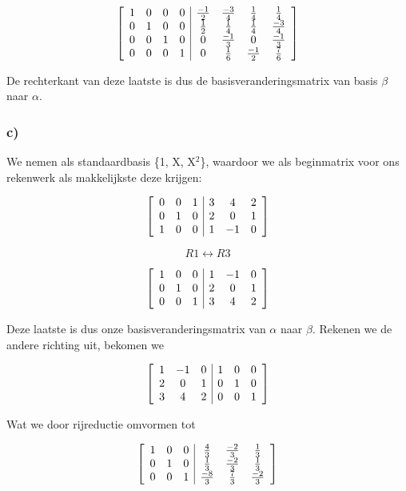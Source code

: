 \documentclass[lineaire_algebra_oplossingen.tex]{subfiles}
\begin{document}
\[
\left[
\begin{array}{ c c c c | c c c c }
1 & 0 & 0 & 0 & \frac{-1}{2} & \frac{-3}{4} & \frac{1}{4} & \frac{1}{4}\\
0 & 1 & 0 & 0 & \frac{1}{2} & \frac{1}{4} & \frac{1}{4} & \frac{-3}{4}\\
0 & 0 & 1 & 0 & 0 & \frac{-1}{3} & 0 & \frac{-1}{3}\\
0 & 0 & 0 & 1 & 0 & \frac{1}{6} & \frac{-1}{2} & \frac{7}{6}
\end{array}
\right]
\]

De rechterkant van deze laatste is dus de basisveranderingsmatrix van basis $\beta$ naar $\alpha$.

\subsubsection*{c)}
We nemen als standaardbasis \{1, X, X$^2$\}, waardoor we als beginmatrix voor ons rekenwerk als makkelijkste deze krijgen:

\[
\left[
\begin{array}{ c c c | c c c }
0 & 0 & 1 & 3 & 4 & 2\\
0 & 1 & 0 & 2 & 0 & 1\\
1 & 0 & 0 & 1 & -1 & 0
\end{array}
\right]
\]

\[R1 \leftrightarrow R3 \]

\[
\left[
\begin{array}{ c c c | c c c }
1 & 0 & 0 & 1 & -1 & 0\\
0 & 1 & 0 & 2 & 0 & 1\\
0 & 0 & 1 & 3 & 4 & 2
\end{array}
\right]
\]

Deze laatste is dus onze basisveranderingsmatrix van $\alpha$ naar $\beta$. Rekenen we de andere richting uit, bekomen we

\[
\left[
\begin{array}{ c c c | c c c }
1 & -1 & 0 & 1 & 0 & 0\\
2 & 0 & 1 & 0 & 1 & 0\\
3 & 4 & 2 & 0 & 0 & 1
\end{array}
\right]
\]

Wat we door rijreductie omvormen tot

\[
\left[
\begin{array}{ c c c | c c c }
1 & 0 & 0 & \frac{4}{3} & \frac{-2}{3} & \frac{1}{3}\\
0 & 1 & 0 & \frac{1}{3} & \frac{-2}{3} & \frac{1}{3}\\
0 & 0 & 1 & \frac{-8}{3} & \frac{7}{3} & \frac{-2}{3}
\end{array}
\right]
\]
\end{document}
